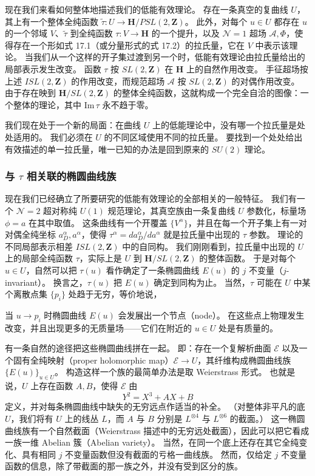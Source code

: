 现在我们来看如何整体地描述我们的低能有效理论。
存在一条真空的复曲线 $U$，其上有一个整体全纯函数 $\tilde\tau:U\to\mathbf{H}/PSL(2,\mathbf{Z})$。
此外，对每个 $u\in U$ 都存在 $u$ 的一个邻域 $V$、$\tilde\tau$ 到全纯函数 $\tau:V\to\mathbf{H}$ 的一个提升，以及 $\mathcal{N}=1$ 超场 $\mathcal{A},\Phi$，使得存在一个形如式 17.1（或分量形式的式 17.2）的拉氏量，它在 $V$ 中表示该理论。
当我们从一个这样的开子集过渡到另一个时，低能有效理论由拉氏量给出的局部表示发生改变。
函数 $\tau$ 按 $SL(2,\mathbf{Z})$ 在 $\mathbf{H}$ 上的自然作用改变。
手征超场按上述 $ISL(2,\mathbf{Z})$ 的作用改变，而规范超场 $\mathcal{A}$ 按 $SL(2,\mathbf{Z})$ 的对偶作用改变。
由于存在映到 $\mathbf{H}/SL(2,\mathbf{Z})$ 的整体全纯函数，这就构成一个完全自洽的图像：一个整体的理论，其中 $\mathrm{Im}\,\tau$ 永不趋于零。

我们现在处于一个新的局面：在曲线 $U$ 上的低能理论中，没有哪一个拉氏量是处处适用的。
我们必须在 $U$ 的不同区域使用不同的拉氏量。
要找到一个处处给出有效描述的单一拉氏量，唯一已知的办法是回到原来的 $SU(2)$ 理论。

\subsubsection{与 $\tau$ 相关联的椭圆曲线族}

现在我们已经确立了所要研究的低能有效理论的全部相关的一般特征。
我们有一个 $\mathcal{N}=2$ 超对称纯 $U(1)$ 规范理论，其真空族由一条复曲线 $U$ 参数化，标量场 $\phi=a$ 在其中取值。
这条曲线有一个开覆盖 $\{V^\alpha\}$，并且在每一个开子集上有一对对偶全纯坐标 $a_D^\alpha,a^\alpha$，使得 $\tau^\alpha=da_D^\alpha/da^\alpha$ 就是拉氏量中出现的 $\tau$ 参数。
理论的不同局部表示相差 $ISL(2,\mathbf{Z})$ 中的自同构。
我们刚刚看到，拉氏量中出现的 $U$ 上的局部全纯函数 $\tau$，实际上是 $U$ 到 $\mathbf{H}/SL(2,\mathbf{Z})$ 的整体函数。
于是对每个 $u\in U$，自然可以把 $\tau(u)$ 看作确定了一条椭圆曲线 $E(u)$ 的 $j$ 不变量（$j$-invariant）。
换言之，$\tau(u)$ 把 $E(u)$ 确定到同构为止。
当然，$\tau$ 可能在 $U$ 中某个离散点集 $\{p_i\}$ 处趋于无穷，等价地说，


当 $u\to p_i$ 时椭圆曲线 $E(u)$ 会发展出一个节点（node）。
在这些点上物理发生改变，并且出现更多的无质量场——它们在附近的 $u\in U$ 处是有质量的。

有一条自然的途径把这些椭圆曲线拼在一起。
即：存在一个复解析曲面 $\mathcal{E}$ 以及一个固有全纯映射（proper holomorphic map）$\mathcal{E}\to U$，其纤维构成椭圆曲线族 $\{E(u)\}_{u\in U}$。
构造这样一个族的最简单办法是取 Weierstrass 形式。
也就是说，$U$ 上存在函数 $A,B$，使得 $\mathcal{E}$ 由
\[
Y^2=X^3+AX+B
\]
定义，并对每条椭圆曲线中缺失的无穷远点作适当的补全。
（对整体非平凡的底 $U$，我们将有 $U$ 上的线丛 $L$，而 $A$ 与 $B$ 分别是 $L^{\otimes4}$ 与 $L^{\otimes6}$ 的截面。）
这一椭圆曲线族有一个自然截面（Weierstrass 描述中的无穷远处截面），因此可以把它看成一族一维 Abelian 簇（Abelian variety）。
当然，在同一个底上还存在其它全纯变化、具有相同 $j$ 不变量函数但没有截面的亏格一曲线族。
然而，仅给定 $j$ 不变量函数的信息，除了带截面的那一族之外，并没有受到区分的族。

